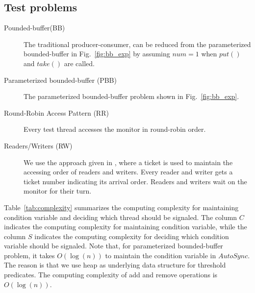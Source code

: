 \documentclass[preprint]{sigplanconf}
\begin{document}
\subsection{Test problems}
\begin{description}
    \item[Pounded-buffer(BB)] The traditional producer-consumer, can be reduced
        from the parameterized bounded-buffer in Fig.~\ref{fig:bb_exp} by
        assuming $num = 1$ when $put()$ and $take()$ are called. 
    \item[Parameterized bounded-buffer (PBB)] The parameterized bounded-buffer 
        problem shown in Fig.~\ref{fig:bb_exp}. 
    \item[Round-Robin Access Pattern (RR)] Every test thread accesses the
        monitor in round-robin order. 
    \item[Readers/Writers (RW)\cite{chp71}] 
    We use the approach given in \cite{bh05}, where a ticket is used
        to maintain the accessing order of readers and writers. Every reader
        and writer gets a ticket number indicating its arrival order. Readers
        and writers wait on the monitor for their turn. \end{description}

Table~\ref{tab:complexity} summarizes the computing complexity for maintaining 
condition variable and deciding which thread should be signaled. The column $C$
indicates the computing complexity for maintaining condition variable, while 
the column $S$ indicates the computing complexity for deciding which condition 
variable should be signaled. Note that, for parameterized bounded-buffer 
problem, it takes $O(\log(n))$ to maintain the condition variable in 
$AutoSync$. The reason 
is that we use heap as underlying data structure for threshold predicates. The 
computing complexity of add and remove operations is $O(\log(n))$.
\end{document}

